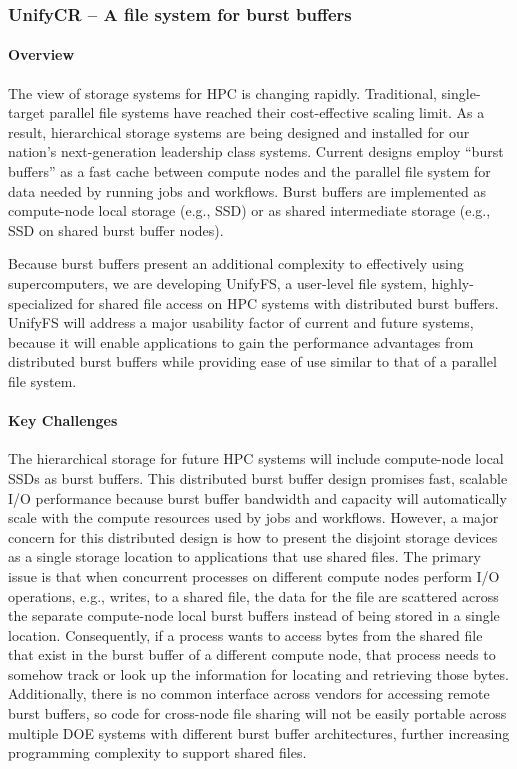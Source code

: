 \subsubsection{ UnifyCR -- A file system for burst buffers} 

\paragraph{Overview} 

The view of storage systems for HPC is changing rapidly. Traditional, 
single-target parallel file systems have reached their cost-effective 
scaling limit. As a result, hierarchical storage systems are being designed 
and installed for our nation's next-generation leadership class systems. 
Current designs employ “burst buffers” as a fast cache between compute 
nodes and the parallel file system for data needed by running jobs and 
workflows. Burst buffers are implemented as compute-node local storage 
(e.g., SSD) or as shared intermediate storage (e.g., SSD on shared burst 
buffer nodes).

Because burst buffers present an additional complexity to effectively
using supercomputers, we are developing UnifyFS, a user-level file system, 
highly-specialized for shared file access on HPC systems with distributed 
burst buffers.  UnifyFS will address a major usability 
factor of current and future systems, because it will enable 
applications to gain the performance advantages from distributed burst buffers 
while providing ease of use similar to that of a parallel file system.


\paragraph{Key  Challenges}

The hierarchical storage for future HPC systems will include compute-node
local SSDs as burst buffers. This distributed burst buffer design promises
fast, scalable I/O performance because burst buffer bandwidth and capacity
will automatically scale with the compute resources used by jobs and
workflows. However, a major concern for this distributed design is how to
present the disjoint storage devices as a single storage location to
applications that use shared files. The primary issue is that when concurrent
processes on different compute nodes perform I/O operations, e.g., writes,
to a shared file, the data for the file are scattered across the separate
compute-node local burst buffers instead of being stored in a single
location. Consequently, if a process wants to access bytes from the
shared file that exist in the burst buffer of a different compute node,
that process needs to somehow track or look up the information for locating
and retrieving those bytes. Additionally, there is no common interface across
vendors for accessing remote burst buffers, so code for cross-node file
sharing will not be easily portable across multiple DOE systems with
different burst buffer architectures, further increasing programming
complexity to support shared files.

